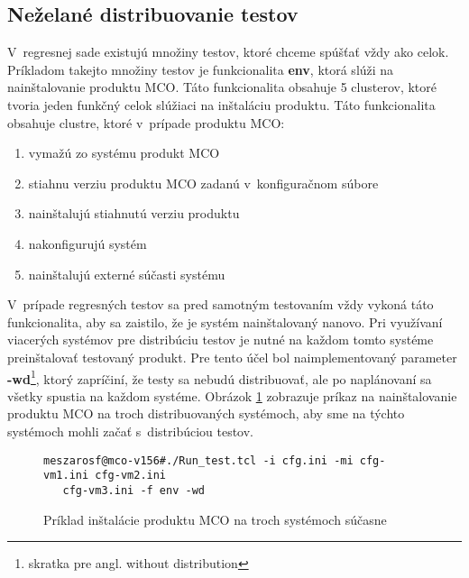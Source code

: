 \subsection*{Neželané distribuovanie testov}
V~regresnej sade existujú množiny testov, ktoré chceme spúšťať vždy ako celok.
Príkladom takejto množiny testov je funkcionalita \textbf{env}, ktorá
slúži na nainštalovanie produktu MCO. Táto funkcionalita obsahuje 5 clusterov,
ktoré tvoria jeden funkčný celok slúžiaci na inštaláciu produktu.
Táto funkcionalita obsahuje clustre, ktoré v~prípade produktu MCO:
\begin{enumerate}
\item vymažú zo systému produkt MCO
\item stiahnu verziu produktu MCO zadanú v~konfiguračnom súbore
\item nainštalujú stiahnutú verziu produktu
\item nakonfigurujú systém
\item nainštalujú externé súčasti systému
\end{enumerate} 

V~prípade regresných testov sa pred samotným testovaním vždy vykoná táto 
funkcionalita, aby sa zaistilo, že je systém nainštalovaný nanovo.
Pri využívaní viacerých systémov pre distribúciu testov je nutné na každom
tomto systéme preinštalovať testovaný produkt. 
Pre tento účel bol naimplementovaný parameter 
\textbf{-wd}\footnote{skratka pre angl. without distribution}, 
ktorý zapríčiní, že testy sa nebudú distribuovať, ale po naplánovaní 
sa všetky spustia na každom systéme. 
Obrázok \ref{obrazok:distribuovana_instalacia} zobrazuje 
príkaz na nainštalovanie produktu MCO na troch distribuovaných systémoch,
aby sme na týchto systémoch mohli začať s~distribúciou testov.


\begin{figure}[h]
\begin{lstlisting}
meszarosf@mco-v156#./Run_test.tcl -i cfg.ini -mi cfg-vm1.ini cfg-vm2.ini 
   cfg-vm3.ini -f env -wd
\end{lstlisting}
\caption{Príklad inštalácie produktu MCO na troch systémoch súčasne}
\label{obrazok:distribuovana_instalacia}
\end{figure}

%
%
